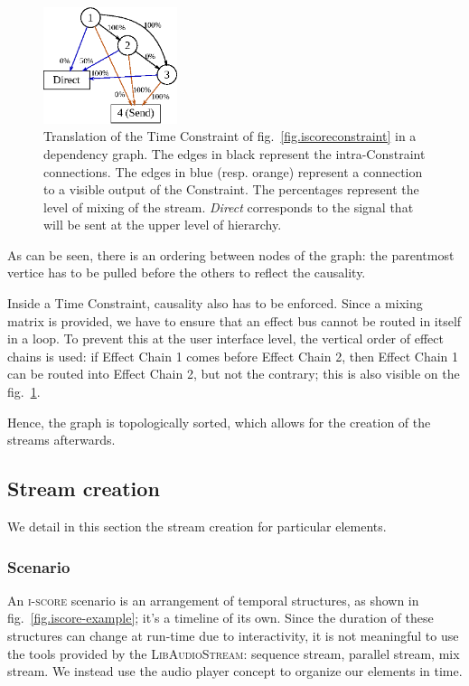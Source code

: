 \documentclass{article}
\newcommand*{\LibAudioStream}{\textsc{LibAudioStream}\xspace}
\newcommand*{\iscore}{\textsc{i-score}\xspace}
\begin{document}
\begin{figure}
	\centering
	\includegraphics[width=0.35\textwidth]{figures/graph1.eps}
	\caption{Translation of the Time Constraint of fig.~\ref{fig.iscoreconstraint} in a dependency graph.
		The edges in black represent the intra-Constraint connections. 
		The edges in blue (resp. orange) represent a connection to a visible output of 
		the Constraint. The percentages represent the level of mixing of the stream.
		\textit{Direct} corresponds to the signal that will be sent at the upper level of hierarchy.}
	\label{fig.graph}
\end{figure}

As can be seen, there is an ordering between nodes of the graph: the parentmost vertice
has to be pulled before the others to reflect the causality.


Inside a Time Constraint, causality also has to be enforced. 
Since a mixing matrix is provided, we have to ensure that an effect bus cannot be routed in 
itself in a loop. 
To prevent this at the user interface level, the vertical order of effect chains is used: 
if Effect Chain 1 comes before Effect Chain 2, then Effect Chain 1 can be routed into Effect Chain 2, but not the contrary; this is also visible on the fig.~\ref{fig.graph}.

Hence, the graph is topologically sorted, which allows for the creation of the streams afterwards.


\subsection{Stream creation}
We detail in this section the stream creation for particular elements.
\subsubsection{Scenario}
An \iscore scenario is an arrangement of temporal structures, as shown in fig.~\ref{fig.iscore-example}; it's a timeline of its own.
Since the duration of these structures can change at run-time due to interactivity, it is not meaningful to use the tools provided by the \LibAudioStream: sequence stream, parallel stream, mix stream.
We instead use the audio player concept to organize our elements in time.
\end{document}
